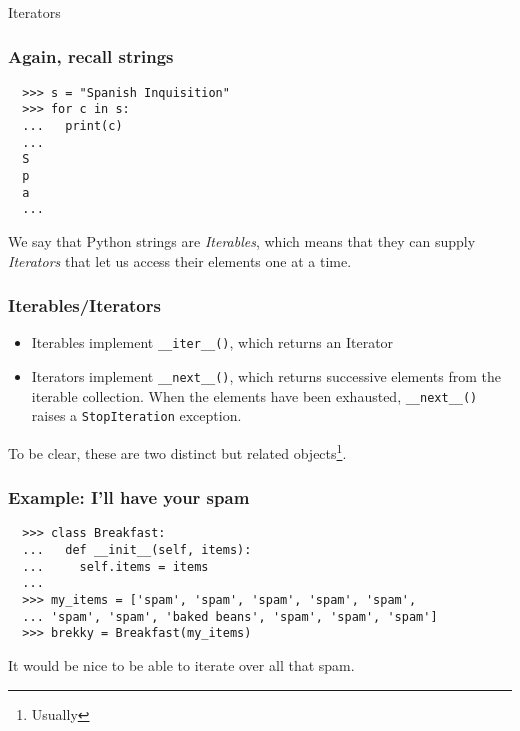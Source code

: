 \documentclass[aspectratio=169]{beamer}
\begin{document}
\begin{frame}
  \frametitle{} 
  \centerline{\huge Iterators}
 \end{frame}

\begin{frame}[fragile]
  \frametitle{Again, recall strings}
  
  \begin{verbatim}
  >>> s = "Spanish Inquisition" 
  >>> for c in s:
  ...   print(c)
  ...
  S
  p
  a
  ...  
  \end{verbatim}
  \bigbreak
  
  We say that Python strings are \emph{Iterables}, which means that they can supply 
  \emph{Iterators} that let us access their elements one at a time.
  
  \end{frame}

\begin{frame}[fragile]
  \frametitle{Iterables/Iterators} 
  
    
  \begin{itemize}
    \item Iterables implement \texttt{\_\_iter\_\_()}, which returns an Iterator 
    \item Iterators implement \texttt{\_\_next\_\_()}, which returns successive elements from the iterable collection. When the elements have been exhausted, \texttt{\_\_next\_\_()} raises a \texttt{StopIteration} exception.
  \end{itemize}
 
    
    \bigbreak
    To be clear, these are two distinct but related objects\footnote{Usually}.
    \end{frame}

\begin{frame}[fragile]
  \frametitle{Example: I'll have your spam}
  
  \begin{verbatim}
  >>> class Breakfast:
  ...   def __init__(self, items):
  ...     self.items = items
  ...
  >>> my_items = ['spam', 'spam', 'spam', 'spam', 'spam',
  ... 'spam', 'spam', 'baked beans', 'spam', 'spam', 'spam']
  >>> brekky = Breakfast(my_items)
  \end{verbatim}
  \bigbreak
  
  It would be nice to be able to iterate over all that spam.
  
  \end{frame}
\end{document}

